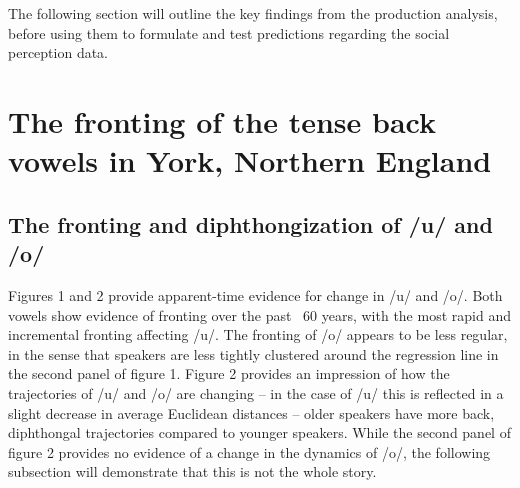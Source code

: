 \documentclass[PWPL]{article}
\begin{document}
The following section will outline the key findings from the production analysis, before using them to formulate and test predictions regarding the social perception data.

\section{The fronting of the tense back vowels in York, Northern England}
\subsection{The fronting and diphthongization of /u/ and /o/}
Figures 1 and 2 provide apparent-time evidence for change in /u/ and /o/. Both vowels show evidence of fronting over the past ~60 years, with the most rapid and incremental fronting affecting /u/. The fronting of /o/ appears to be less regular, in the sense that speakers are less tightly clustered around the regression line in the second panel of figure 1. Figure 2 provides an impression of how the trajectories of /u/ and /o/ are changing -- in the case of /u/ this is reflected in a slight decrease in average Euclidean distances -- older speakers have more back, diphthongal trajectories compared to younger speakers. While the second panel of figure 2 provides no evidence of a change in the dynamics of /o/, the following subsection will demonstrate that this is not the whole story.
\end{document}
